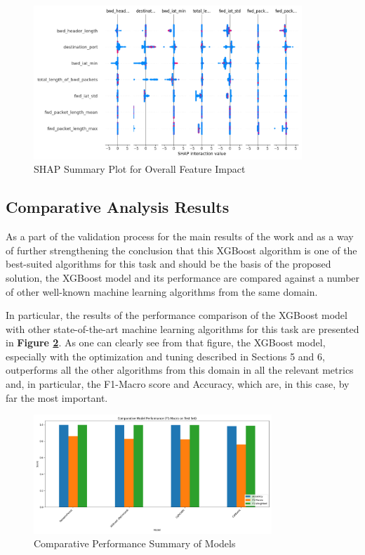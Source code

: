 \begin{figure}[H]
	\centering
	\includegraphics[width=0.9\textwidth]{assets/figures/results/shap_summary_plot_overall.png}
	\caption{SHAP Summary Plot for Overall Feature Impact}
	\label{fig:shap_summary_plot}
\end{figure}

\subsection{Comparative Analysis Results}

As a part of the validation process for the main results of the work and as a way of further strengthening the conclusion that this XGBoost algorithm is one of the best-suited algorithms for this task and should be the basis of the proposed solution, the XGBoost model and its performance are compared against a number of other well-known machine learning algorithms from the same domain.

In particular, the results of the performance comparison of the XGBoost model with other state-of-the-art machine learning algorithms for this task are presented in \textbf{Figure \ref{fig:comparative_performance_summary}}. As one can clearly see from that figure, the XGBoost model, especially with the optimization and tuning described in Sections 5 and 6, outperforms all the other algorithms from this domain in all the relevant metrics and, in particular, the F1-Macro score and Accuracy, which are, in this case, by far the most important.

\begin{figure}[H]
	\centering
	\includegraphics[width=0.8\textwidth]{assets/figures/results/comparative_performance_summary.png}
	\caption{Comparative Performance Summary of Models}
	\label{fig:comparative_performance_summary}
\end{figure}

